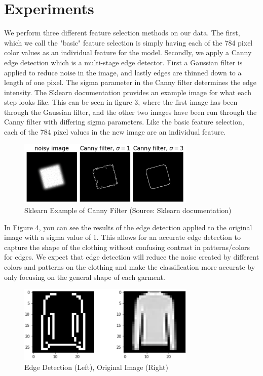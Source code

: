 
\section{Experiments}
\label{sec:expts}

We perform three different feature selection methods on our data. The first, which we call the "basic" feature selection is simply having each of the 784 pixel color values as an individual feature for the model. Secondly, we apply a Canny edge detection which is a multi-stage edge detector. First a Gaussian filter is applied to reduce noise in the image, and lastly edges are thinned down to a length of one pixel. The sigma parameter in the Canny filter determines the edge intensity. The Sklearn documentation provides an example image for what each step looks like. This can be seen in figure 3, where the first image has been through the Gaussian filter, and the other two images have been run through the Canny filter with differing sigma parameters. Like the basic feature selection, each of the 784 pixel values in the new image are an individual feature.

\begin{figure}[!h]
    \centering
    \includegraphics[width=3.33in]{canny_sklearn.png}
    \caption{Sklearn Example of Canny Filter (Source: Sklearn documentation)}
    \label{fig:my_label}
\end{figure}

In Figure 4, you can see the results of the edge detection applied to the original image with a sigma value of 1. This allows for an accurate edge detection to capture the shape of the clothing without confusing contrast in patterns/colors for edges. We expect that edge detection will reduce the noise created by different colors and patterns on the clothing and make the classification more accurate by only focusing on the general shape of each garment.

\begin{figure}[!h]
    \centering
    \includegraphics[width=3.33in]{canny_ex.png}
    \caption{Edge Detection (Left), Original Image (Right)}
    \label{fig:my_label}
\end{figure}

